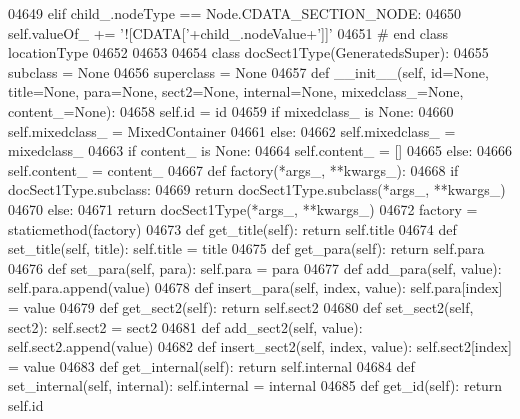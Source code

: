 \begin{DoxyCode}
{{{{{{{{{{{{{{{{{{{{{{{{{{{{{{{{{{{{{{{{{{{{{{{{{{{{{{{{{{{{{{{{{{{{{{{{{{{{{{{{{{{{{{{{{{{{{{{{{{{{{{{{{{{{{{{{{{{{{{{{{{{{{{{{{{{{{{{{{{{{{{{{{{{{{{{{{{{{{{{{{{{{{{{{{{{{{{{{{{{{{{{{{{{{{{{{{{{{{{{{{{{{{{{{{{{{{{{{{{{{{{{{{{{{{{{{{{{{{{{{{{{{{{{{{{{{{{{{{{{{{{{{{{{{{{{{{{{{{{{{{{{{{{{{{{{{{{{{{{{{{{{{{{{{{{{{{{{{{{{{04649         \textcolor{keywordflow}{elif} child\_.nodeType == Node.CDATA\_SECTION\_NODE:
04650             self.valueOf_ += \textcolor{stringliteral}{'![CDATA['}+child\_.nodeValue+\textcolor{stringliteral}{']]'}
04651 \textcolor{comment}{# end class locationType}
04652 
04653 
04654 \textcolor{keyword}{class }docSect1Type(GeneratedsSuper):
04655     subclass = \textcolor{keywordtype}{None}
04656     superclass = \textcolor{keywordtype}{None}
04657     \textcolor{keyword}{def }__init__(self, id=None, title=None, para=None, sect2=None, internal=None, mixedclass\_=None, 
      content\_=None):
04658         self.id = id
04659         \textcolor{keywordflow}{if} mixedclass\_ \textcolor{keywordflow}{is} \textcolor{keywordtype}{None}:
04660             self.mixedclass_ = MixedContainer
04661         \textcolor{keywordflow}{else}:
04662             self.mixedclass_ = mixedclass\_
04663         \textcolor{keywordflow}{if} content\_ \textcolor{keywordflow}{is} \textcolor{keywordtype}{None}:
04664             self.content_ = []
04665         \textcolor{keywordflow}{else}:
04666             self.content_ = content\_
04667     \textcolor{keyword}{def }factory(*args\_, **kwargs\_):
04668         \textcolor{keywordflow}{if} docSect1Type.subclass:
04669             \textcolor{keywordflow}{return} docSect1Type.subclass(*args\_, **kwargs\_)
04670         \textcolor{keywordflow}{else}:
04671             \textcolor{keywordflow}{return} docSect1Type(*args\_, **kwargs\_)
04672     factory = staticmethod(factory)
04673     \textcolor{keyword}{def }get_title(self): \textcolor{keywordflow}{return} self.title
04674     \textcolor{keyword}{def }set_title(self, title): self.title = title
04675     \textcolor{keyword}{def }get_para(self): \textcolor{keywordflow}{return} self.para
04676     \textcolor{keyword}{def }set_para(self, para): self.para = para
04677     \textcolor{keyword}{def }add_para(self, value): self.para.append(value)
04678     \textcolor{keyword}{def }insert_para(self, index, value): self.para[index] = value
04679     \textcolor{keyword}{def }get_sect2(self): \textcolor{keywordflow}{return} self.sect2
04680     \textcolor{keyword}{def }set_sect2(self, sect2): self.sect2 = sect2
04681     \textcolor{keyword}{def }add_sect2(self, value): self.sect2.append(value)
04682     \textcolor{keyword}{def }insert_sect2(self, index, value): self.sect2[index] = value
04683     \textcolor{keyword}{def }get_internal(self): \textcolor{keywordflow}{return} self.internal
04684     \textcolor{keyword}{def }set_internal(self, internal): self.internal = internal
04685     \textcolor{keyword}{def }get_id(self): \textcolor{keywordflow}{return} self.id
}}}}}}}}}}}}}}}}}}}}}}}}}}}}}}}}}}}}}}}}}}}}}}}}}}}}}}}}}}}}}}}}}}}}}}}}}}}}}}}}}}}}}}}}}}}}}}}}}}}}}}}}}}}}}}}}}}}}}}}}}}}}}}}}}}}}}}}}}}}}}}}}}}}}}}}}}}}}}}}}}}}}}}}}}}}}}}}}}}}}}}}}}}}}}}}}}}}}}}}}}}}}}}}}}}}}}}}}}}}}}}}}}}}}}}}}}}}}}}}}}}}}}}}}}}}}}}}}}}}}}}}}}}}}}}}}}}}}}}}}}}}}}}}}}}}}}}}}}}}}}}}}}}}}}}}}}}}}}}}}
\end{DoxyCode}
